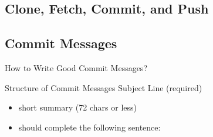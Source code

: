 \subsection{Clone, Fetch, Commit, and Push}
\slideCloneFetch

\slideCommitPush

\subsection{Commit Messages}

\begin{frame}{How to Write Good Commit Messages?}
	\begin{fancycolumns}
		\begin{definition}{Structure of Commit Messages }
			Subject Line (required)
			\vspace{-1mm}
			\begin{itemize}
				\item short summary (72 chars or less)
				\item should complete the following sentence:\\
			\end{itemize}
			

\end{definition}
\end{fancycolumns}
\end{frame}
